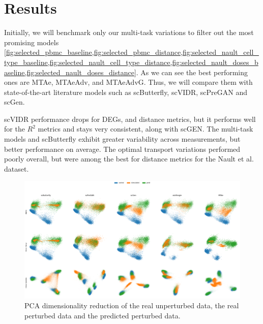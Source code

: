 \documentclass[12pt, a4paper]{article}
\begin{document}
\clearpage

\section{Results}

Initially, we will benchmark only our multi-task variations to filter out the most promising models \cref{fig:selected_pbmc_baseline,fig:selected_pbmc_distance,fig:selected_nault_cell_type_baseline,fig:selected_nault_cell_type_distance,fig:selected_nault_doses_baseline,fig:selected_nault_doses_distance}.
As we can see the best performing ones are MTAe, MTAeAdv, and MTAeAdvG. Thus, we will compare them with state-of-the-art literature models such as scButterfly, scVIDR, scPreGAN and scGen.

scVIDR performance drops for DEGs, and distance metrics, but it performs well for the $R^2$ metrics and stays very consistent, along with scGEN. The multi-task models and scButterfly exhibit greater variability across measurements, but better performance on average. The optimal transport variations performed poorly overall, but were among the best for distance metrics for the Nault et al. \cite{nault2021single,nault2022benchmarking} dataset. 


\begin{figure}[h!]
    \centering
    \includegraphics[width=\textwidth]{pcas.png}
    \caption{PCA dimensionality reduction of the real unperturbed data, the real perturbed data and the predicted perturbed data.}
    \label{fig:selected_nault_cell_type_baseline}
\end{figure}

\clearpage
\end{document}
